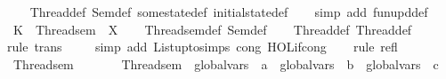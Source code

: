 \begin{isabellebody}
%
\isadelimproof
\ \ %
\endisadelimproof
%
\isatagproof
{}\isamarkupfalse%
\ Thread{}{\isacharunderscore}{\kern0pt}def\ Sem{\isacharunderscore}{\kern0pt}def\ some{\isacharunderscore}{\kern0pt}state{\isacharunderscore}{\kern0pt}def\ initial{\isacharunderscore}{\kern0pt}state{\isacharunderscore}{\kern0pt}def\isanewline
\ \ \isamarkupfalse%
\ {\isacharparenleft}{\kern0pt}simp\ add{\isacharcolon}{\kern0pt}\ fun{\isacharunderscore}{\kern0pt}upd{\isacharunderscore}{\kern0pt}def{\isacharparenright}{\kern0pt}%
\endisatagproof
{\isafoldproof}%
%
\isadelimproof
\isanewline
%
\endisadelimproof
\isanewline
\isanewline
{}\isamarkupfalse%
\ K\ {\isacharcolon}{\kern0pt}\ {\isachardoublequoteopen}Thread{}{\isacharunderscore}{\kern0pt}sem\ {\isacharequal}{\kern0pt}\ {\isacharquery}{\kern0pt}X{\isachardoublequoteclose}\isanewline
%
\isadelimproof
\ \ %
\endisadelimproof
%
\isatagproof
{}\isamarkupfalse%
\ Thread{}{\isacharunderscore}{\kern0pt}sem{\isacharunderscore}{\kern0pt}def\ Sem{\isacharunderscore}{\kern0pt}def\isanewline
\ \ \isamarkupfalse%
\ Thread{}{\isacharunderscore}{\kern0pt}def\ Thread{}{\isacharunderscore}{\kern0pt}def\isanewline
\ \ \ \isamarkupfalse%
{\isacharparenleft}{\kern0pt}rule\ trans{\isacharparenright}{\kern0pt}\isanewline
\ \ \ \isamarkupfalse%
\ {\isacharparenleft}{\kern0pt}simp\ add{\isacharcolon}{\kern0pt}\ List{\isachardot}{\kern0pt}upto{\isachardot}{\kern0pt}simps\ cong{\isacharcolon}{\kern0pt}\ HOL{\isachardot}{\kern0pt}if{\isacharunderscore}{\kern0pt}cong{\isacharparenright}{\kern0pt}\isanewline
\ \ \isamarkupfalse%
\ {\isacharparenleft}{\kern0pt}rule\ refl{\isacharparenright}{\kern0pt}%
\endisatagproof
{\isafoldproof}%
%
\isadelimproof
\isanewline
%
\endisadelimproof
\ \ \isanewline
\isanewline
\isanewline
{}\isamarkupfalse%
\ Thread{}{\isacharunderscore}{\kern0pt}sem\ {\isacharcolon}{\kern0pt}\ \isanewline
\ \ \ \ {\isacartoucheopen}\ Thread{}{\isacharunderscore}{\kern0pt}sem\ {\isacharequal}{\kern0pt}\ {\isacharparenleft}{\kern0pt}{\isacharparenleft}{\kern0pt}global{\isacharunderscore}{\kern0pt}vars\ {\isasymsigma}\ {\isacharprime}{\kern0pt}{\isacharprime}{\kern0pt}a{\isacharprime}{\kern0pt}{\isacharprime}{\kern0pt}\ {\isacharbar}{\kern0pt}{\isacharbar}{\kern0pt}{\isacharbar}{\kern0pt}\ {\isacharparenleft}{\kern0pt}global{\isacharunderscore}{\kern0pt}vars\ {\isasymsigma}\ {\isacharprime}{\kern0pt}{\isacharprime}{\kern0pt}b{\isacharprime}{\kern0pt}{\isacharprime}{\kern0pt}\ {\isacharbar}{\kern0pt}{\isacharbar}{\kern0pt}{\isacharbar}{\kern0pt}\ global{\isacharunderscore}{\kern0pt}vars\ {\isasymsigma}\ {\isacharprime}{\kern0pt}{\isacharprime}{\kern0pt}c{\isacharprime}{\kern0pt}{\isacharprime}{\kern0pt}{\isacharparenright}{\kern0pt}{\isacharparenright}{\kern0pt}\ \isanewline

\end{isabellebody}
